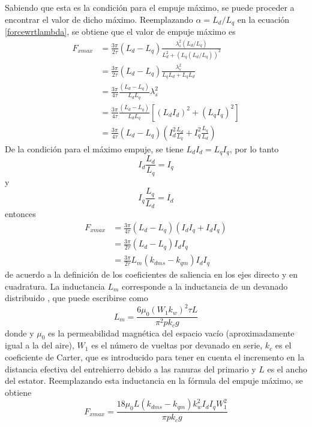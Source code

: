 Sabiendo que esta es la condición para el empuje máximo, se puede proceder a encontrar el valor de dicho máximo. Reemplazando $\alpha = L_d/L_q$ en la ecuación \ref{forcewrtlambda}, se obtiene que el valor de empuje máximo es
\begin{align*}
F_{xmax} &= \frac{3\pi}{2\tau}(L_d-L_q)
\frac{\lambda_s^2 (L_d/L_q)}{L_d^2 + (L_q (L_d/L_q))^2} \\
&= \frac{3\pi}{2\tau}(L_d-L_q)\frac{\lambda_s^2}{L_q L_d + L_q L_d}\\
&= \frac{3\pi}{4\tau}\frac{(L_d-L_q)}{L_d L_q}\lambda_s^2\\
&= \frac{3\pi}{4\tau}\frac{(L_d-L_q)}{L_d L_q}\left[ (L_d I_d)^2+(L_q I_q)^2 \right]\\
&= \frac{3\pi}{4\tau}(L_d-L_q)
\left(
I_d^2\frac{L_d}{L_q}+I_q^2\frac{L_q}{L_d}
\right)
\end{align*}
De la condición para el máximo empuje, se tiene $L_d I_d = L_q I_q$, por lo tanto
\begin{equation*}
I_d \frac{L_d}{L_q} = I_q
\end{equation*}
y
\begin{equation*}
I_q \frac{L_q}{L_d} = I_d
\end{equation*}
entonces
\begin{align*}
F_{xmax} &= \frac{3\pi}{4\tau}(L_d-L_q)(I_d I_q + I_d I_q)\\
&= \frac{3\pi}{2\tau} (L_d-L_q)I_d I_q\\
&= \frac{3\pi}{2\tau}L_m
(k_{dms}-k_{qm})I_d I_q
\end{align*}
de acuerdo a la definición de los coeficientes de saliencia en los ejes directo y en cuadratura. La inductancia $L_m$ corresponde a la inductancia de un devanado distribuido \cite{fitzgerald2003}, que puede escribirse como
\begin{equation}
L_m = \frac{6\mu_0(W_1 k_w)^2\tau L}{\pi^2 p k_c g}
\end{equation}
donde y $\mu_0$ es la permeabilidad magnética del espacio vacío (aproximadamente igual a la del aire), $W_1$ es el número de vueltas por devanado en serie, $k_c$ es el coeficiente de Carter, que es introducido para tener en cuenta el incremento en la distancia efectiva del entrehierro debido a las ranuras del primario \cite{boldea2010} y $L$ es el ancho del estator. Reemplazando esta inductancia en la fórmula del empuje máximo, se obtiene
\begin{equation}
F_{xmax} = \frac{18\mu_0 L(k_{dms}-k_{qm})k_w^2 I_d I_q W_1^2}{\pi p k_c g}
\end{equation}

